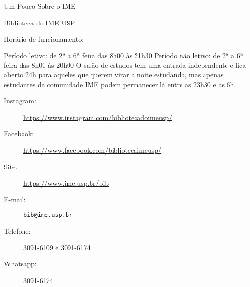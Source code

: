 \begin{secao}{Um Pouco Sobre o IME}
\begin{subsecao}{Biblioteca do IME-USP}
\begin{subsubsecao}{Horário de funcionamento:}

Período letivo: de 2ª a 6ª feira das 8h00 às 21h30 \newline
Período não letivo: de 2ª a 6ª feira das 8h00 às 20h00 \newline
O salão de estudos tem uma entrada independente e fica aberto 24h para aqueles que querem 
virar a noite estudando, mas apenas estudantes da comunidade IME podem permanecer lá entre as 23h30 e as 6h.
\end{subsubsecao}
\begin{description}
  \item[Instagram:] \url{https://www.instagram.com/bibliotecadoimeusp/}
  \item[Facebook:] \url{https://www.facebook.com/bibliotecaimeusp/}
  \item[Site:] \url{https://www.ime.usp.br/bib}
  \item[E-mail:] \texttt{bib@ime.usp.br}
  \item[Telefone:] 3091-6109 e 3091-6174
  \item[Whatsapp:] 3091-6174
\end{description}

\end{subsecao}
\end{secao}
